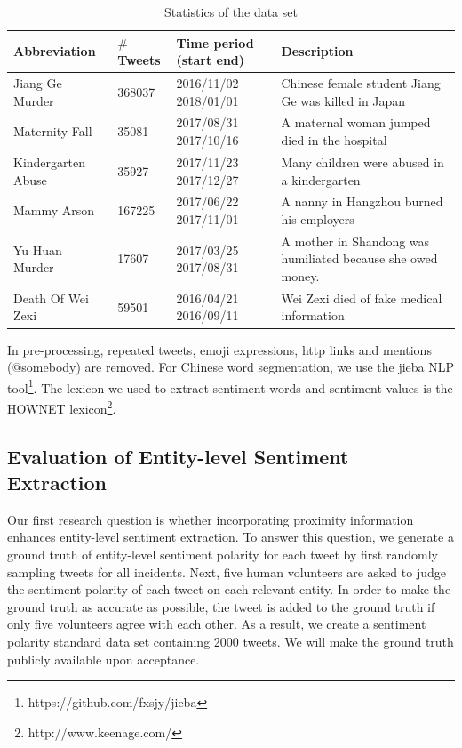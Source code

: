 \documentclass[runningheads]{llncs}
\begin{document}
\begin{table}
\begin{center}
\tiny
\begin{tabular}{|l|l|l|l|}
\hline
Abbreviation   & $\#$Tweets & Time period (start end) &  Description                                           \\ \hline
Jiang Ge Murder      & 368037 & 2016/11/02 2018/01/01   & Chinese female student Jiang Ge was killed in Japan         \\ \hline
Maternity Fall        & 35081  & 2017/08/31 2017/10/16   & A maternal woman jumped died in the hospital                \\ \hline
Kindergarten Abuse     & 35927  & 2017/11/23 2017/12/27   & Many children were abused in a kindergarten                 \\ \hline
Mammy Arson  & 167225 & 2017/06/22 2017/11/01   & A nanny in Hangzhou burned his employers                    \\ \hline
Yu Huan Murder & 17607  & 2017/03/25 2017/08/31   & A mother in Shandong was humiliated because she owed money. \\ \hline
Death Of Wei Zexi   & 59501  & 2016/04/21 2016/09/11   & Wei Zexi died of fake medical information                   \\ \hline
\end{tabular}
\end{center}
\caption{Statistics of the data set}\label{table:social event}
\label{default}
\end{table}

In pre-processing, repeated tweets, emoji expressions, http links and mentions (@somebody) are removed. For Chinese word segmentation, we use the jieba NLP tool\footnote{https://github.com/fxsjy/jieba}. The lexicon we used to extract sentiment words and sentiment values is the HOWNET lexicon\footnote{http://www.keenage.com/}. 



\subsection{Evaluation of Entity-level Sentiment Extraction}\label{sec:Evaluation of Entity-level Sentiment Extraction}
Our first research question is whether incorporating proximity information enhances entity-level sentiment extraction. To answer this question, we generate a ground truth of entity-level sentiment polarity for each tweet by first randomly sampling tweets 
for all incidents. Next, five human volunteers are asked to judge the sentiment polarity of each tweet on each relevant entity. In order to make the ground truth as accurate as possible, the tweet is added to the ground truth if only five volunteers agree with each other. 
As a result, we create a sentiment polarity standard data set containing 2000 tweets.
We will make the ground truth publicly available upon acceptance. 
\end{document}
